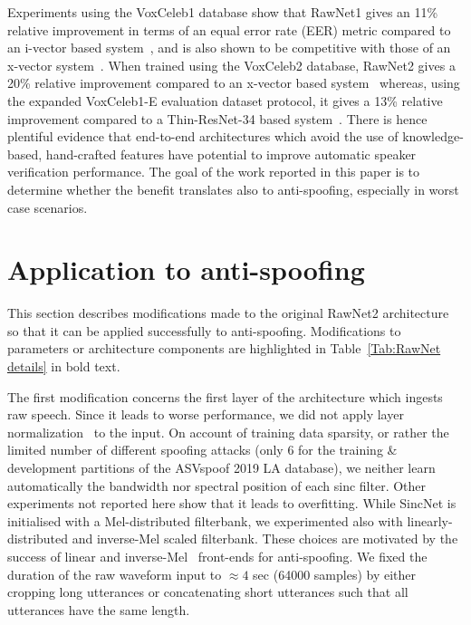 \documentclass{article}
\begin{document}
Experiments using the VoxCeleb1 database show that
RawNet1 gives an 11\% relative improvement in terms of an equal error rate (EER) metric compared to an i-vector based system~\cite{shon2018frame}, %
and is also shown to be competitive with those of an x-vector system~\cite{okabe2018attentive}.
When trained using the VoxCeleb2 database, RawNet2 gives a 20\% relative improvement compared to an x-vector based system~\cite{snyder2018x} whereas, using the expanded VoxCeleb1-E evaluation dataset protocol, it gives a 13\% relative improvement compared to a Thin-ResNet-34 based system~\cite{nagrani2020voxceleb}. There is hence plentiful evidence that end-to-end architectures which avoid the use of knowledge-based, hand-crafted features have potential to improve automatic speaker verification performance. The goal of the work reported in this paper is to determine whether the benefit translates also to anti-spoofing, especially in worst case scenarios.




\section{Application to anti-spoofing}
This section describes modifications made to the original RawNet2 architecture~\cite{jung2020improved} so that it can be applied successfully to anti-spoofing. Modifications to parameters or architecture components are highlighted in Table~\ref{Tab:RawNet details} in bold text.

The first modification concerns the first layer of the architecture which ingests raw speech. Since it leads to worse performance, we did not apply layer normalization~\cite{ba2016layer} to the input. On account of training data sparsity, or rather the limited number of different spoofing attacks (only 6 for the training \& development partitions of the ASVspoof 2019 LA database), we neither learn automatically the bandwidth nor spectral position of each sinc filter. Other experiments not reported here show that it leads to overfitting. 
While SincNet is initialised with a Mel-distributed filterbank, we experimented also with linearly-distributed and inverse-Mel scaled filterbank. These choices are motivated by the success of linear and inverse-Mel~\cite{sahidullah2015comparison} front-ends for anti-spoofing. We fixed the duration of the raw waveform input to {$\approx 4$} sec (64000 samples) by either cropping long utterances or concatenating short utterances such that all utterances have the same length.
\end{document}
